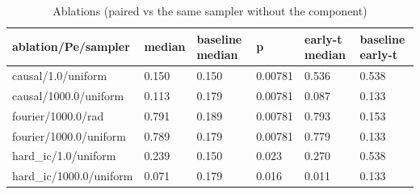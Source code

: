 \begin{table}[t]\centering\small\caption{Ablations (paired vs the same sampler without the component)}\label{tab:phase3_ablation}
\begin{tabular}{llllll}\toprule
ablation/Pe/sampler & median & baseline median & p & early-t median & baseline early-t \\ \midrule
causal/1.0/uniform & 0.150 & 0.150 & 0.00781 & 0.536 & 0.538 \\
causal/1000.0/uniform & 0.113 & 0.179 & 0.00781 & 0.087 & 0.133 \\
fourier/1000.0/rad & 0.791 & 0.189 & 0.00781 & 0.793 & 0.153 \\
fourier/1000.0/uniform & 0.789 & 0.179 & 0.00781 & 0.779 & 0.133 \\
hard\_ic/1.0/uniform & 0.239 & 0.150 & 0.023 & 0.270 & 0.538 \\
hard\_ic/1000.0/uniform & 0.071 & 0.179 & 0.016 & 0.011 & 0.133 \\
\bottomrule\end{tabular}\end{table}
